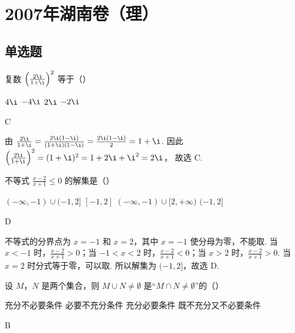 \chapter{2007年湖南卷（理）}

\section{单选题}

\begin{problem}
复数 \(\left(\frac{2\i}{1 + \i}\right)^2\) 等于（\quad）

\choices
    {\(4\i\)}
    {\(-4\i\)}
    {\(2\i\)}
    {\(-2\i\)}
\end{problem}

\begin{answer}
C
\end{answer}

\begin{solution}
由
\(\frac{2\i}{1+\i}=\frac{2\i(1-\i)}{(1+\i)(1-\i)}=\frac{2\i(1-\i)}{2}=1+\i\).
因此
\(\left(\frac{2\i}{1+\i}\right)^2=(1+\i)^2=1+2\i+\i^2=2\i\)，
故选 C.
\end{solution}

\begin{problem}
不等式 \(\frac{x - 2}{x + 1} \leqslant 0\) 的解集是（\quad）

\choices
    {\((-\infty, -1) \cup (-1, 2]\)}
    {\([-1, 2]\)}
    {\((-\infty, -1) \cup [2, +\infty)\)}
    {\((-1, 2]\)}
\end{problem}

\begin{answer}
D
\end{answer}

\begin{solution}
不等式的分界点为 \(x=-1\) 和 \(x=2\)，其中 \(x=-1\) 使分母为零，不能取. 当 \(x<-1\) 时，\(\frac{x-2}{x+1}>0\)；当 \(-1<x<2\) 时，\(\frac{x-2}{x+1}<0\)；当 \(x>2\) 时，\(\frac{x-2}{x+1}>0\).
当 \(x=2\) 时分式等于零，可以取. 所以解集为 \((-1,2]\)，故选 D.
\end{solution}

\begin{problem}
设 \(M\)，\(N\) 是两个集合，则 \(M \cup N \neq \emptyset\) 是“\(M \cap N \neq \emptyset\)”的（\quad）

\choices
    {充分不必要条件}
    {必要不充分条件}
    {充分必要条件}
    {既不充分又不必要条件}
\end{problem}

\begin{answer}
B
\end{answer}

